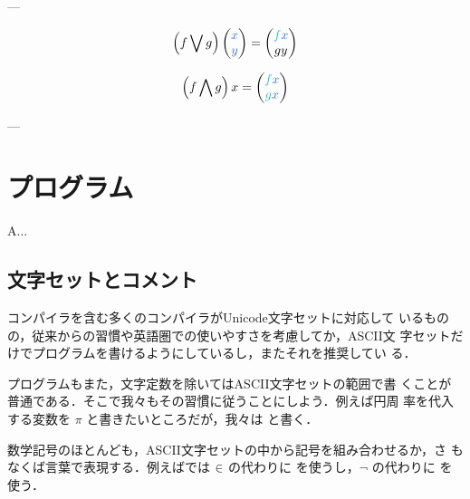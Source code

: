 \documentclass[a5paper,twoside,fleqn,draft]{jsbook}
\begin{document}
---

\begin{equation}
  \left(f\bigvee g\right)\hPairWith{\hVar{x}}{\hVar{y}}=\hPairWith{\hFunc{f}\hVar{x}}{gy}
\end{equation}

\begin{equation}
  \left(f\bigwedge g\right)x=\hPairWith{\hFunc{f}\hVar{x}}{\hFunc{g}\hVar{x}}
\end{equation}

---




\chapter{プログラム}
\label{ch:program}

\begin{leader}
A...
\end{leader}

\section{文字セットとコメント}

\haskell コンパイラを含む多くのコンパイラがUnicode文字セットに対応して
いるものの，従来からの習慣や英語圏での使いやすさを考慮してか，ASCII文
字セットだけでプログラムを書けるようにしているし，またそれを推奨してい
る．

\haskell プログラムもまた，文字定数を除いてはASCII文字セットの範囲で書
くことが普通である．そこで我々もその習慣に従うことにしよう．例えば円周
率を代入する変数を $\pi$ と書きたいところだが，我々は  と書く．

数学記号のほとんども，ASCII文字セットの中から記号を組み合わせるか，さ
もなくば言葉で表現する．例えば\haskell では $\operatorname{\in}$ の代わりに
\code{<-} を使うし，$\neg$ の代わりに  を使う．
\end{document}
